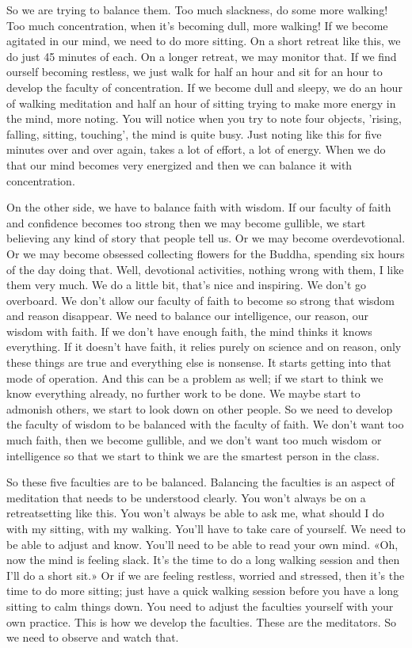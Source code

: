 \documentclass[letterpaper,10pt,english]{sphinxmanual}
\begin{document}
\sphinxAtStartPar
So we are trying to balance them. Too much slackness, do some more
walking! Too much concentration, when it’s becoming dull, more walking!
If we become agitated in our mind, we need to do more sitting. On a short
retreat like this, we do just 45 minutes of each. On a longer retreat, we may
monitor  that.  If  we  find  ourself  becoming  restless,  we  just  walk  for  half
an  hour  and  sit  for  an  hour  to  develop  the  faculty  of  concentration.  If  we
become dull and sleepy, we do an hour of walking meditation and half an
hour of sitting trying to make more energy in the mind, more noting. You
will notice when you try to note four objects, ’rising, falling, sitting, touching’, the mind is quite busy. Just noting like this for five minutes over and
over again, takes a lot of effort, a lot of energy. When we do that our mind
becomes very energized and then we can balance it with concentration.

\sphinxAtStartPar
On the other side, we have to balance faith with wisdom. If our faculty
of faith and confidence becomes too strong then we may become gullible, we
start believing any kind of story that people tell us. Or we may become overdevotional.   Or we may become obsessed collecting flowers for the Buddha,
spending six hours of the day doing that. Well, devotional activities, nothing wrong with them, I like them very much. We do a little bit, that’s nice
and  inspiring. We  don’t  go  overboard. We  don’t  allow  our  faculty  of  faith
to become so strong that wisdom and reason disappear. We need to balance
our intelligence, our reason, our wisdom with faith. If we don’t have enough
faith, the mind thinks it knows everything. If it doesn’t have faith, it relies
purely on science and on reason, only these things are true and everything
else is nonsense. It starts getting into that mode of operation. And this can
be a problem as well; if we start to think we know everything already, no
further work to be done. We maybe start to admonish others, we start to look
down on other people. So we need to develop the faculty of wisdom to be
balanced with the faculty of faith. We don’t want too much faith, then we
become gullible, and we don’t want too much wisdom or intelligence so that
we start to think we are the smartest person in the class.

\sphinxAtStartPar
So these five faculties are to be balanced. Balancing the faculties is an
aspect of meditation that needs to be understood clearly. You won’t always
be on a retreat\sphinxhyphen{}setting like this. You won’t always be able to ask me, what
should I do with my sitting, with my walking. You’ll have to take care of
yourself. We need to be able to adjust and know. You’ll need to be able to
read your own mind. «Oh, now the mind is feeling slack. It’s the time to do
a long walking session and then I’ll do a short sit.» Or if we are feeling restless, worried and stressed, then it’s the time to do more sitting; just have a
quick walking session before you have a long sitting to calm things down.
You need to adjust the faculties yourself with your own practice. This is how
we develop the faculties. These are the meditators. So we need to observe
and watch that.
\end{document}
